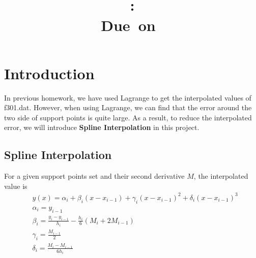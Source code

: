 \documentclass{article}
\title{
    \vspace{2in}
    \textmd{\textbf{\hmwkClass}}\\
    \textmd{\textbf{\hmwkID: \hmwkTitle}} \\
    \normalsize\vspace{0.1in}\small{Due\ on\ \hmwkDueDate}\\
    \vspace{3in}
}
\author{\textbf{\hmwkAuthorName}}
\date{} %
\begin{document}
\maketitle
\newpage

\section{Introduction}
In previous homework, we have used Lagrange to get the interpolated values of f301.dat. However, when using Lagrange, we can find 
that the error around the two side of support points is quite large. As a result, to reduce the interpolated error, we will
introduce \textbf{Spline Interpolation} in this project.
\subsection{Spline Interpolation}
For a given support points set and their second derivative $M$, the interpolated value is
\begin{align}
    &y(x) = \alpha_i + \beta_i(x-x_{i-1}) + \gamma_i(x-x_{i-1})^2 + \delta_i(x-x_{i-1})^3 \\
    &\alpha_i = y_{i-1} \\
    &\beta_i = \frac{y_i - y_{i-1}}{h_i} - \frac{h_i}{6}(M_i + 2M_{i-1}) \\
    &\gamma_i = \frac{M_{i-1}}{2} \\
    &\delta_i = \frac{M_i - M_{i-1}}{6h_i}
\end{align}
\end{document}
